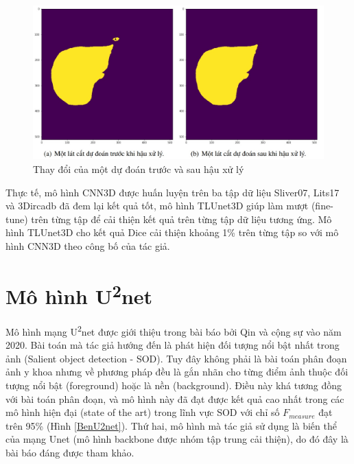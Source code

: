\begin{figure}[H]
    \centering
    \includegraphics[width=12cm]{images/liver/TLUnet3D/posprocessing.jpg}
    \caption{Thay đổi của một dự đoán trước và sau hậu xử lý \cite{LV_LIVER}}
    \label{posprocessing}
\end{figure}
\vspace{-5mm}
Thực tế, mô hình CNN3D được huấn luyện trên ba tập dữ liệu Sliver07, Lits17 và 3Dircadb đã đem lại kết quả tốt, mô hình TLUnet3D giúp làm mượt (fine-tune) trên từng tập để cải thiện kết quả trên từng tập dữ liệu tương ứng. Mô hình TLUnet3D cho kết quả Dice cải thiện khoảng 1\% trên từng tập so với mô hình CNN3D theo công bố của tác giả. 

\newpage

\section{Mô hình U\textsuperscript{2}net}
Mô hình mạng U\textsuperscript{2}net được giới thiệu trong bài báo \cite{u2-net} bởi Qin và cộng sự vào năm 2020. Bài toán mà tác giả hướng đến là phát hiện đối tượng nổi bật nhất trong ảnh (Salient object detection - SOD). Tuy đây không phải là bài toán phân đoạn ảnh y khoa nhưng về phương pháp đều là gắn nhãn cho từng điểm ảnh thuộc đối tượng nổi bật (foreground) hoặc là nền (background). Điều này khá tương đồng với bài toán phân đoạn, và mô hình này đã đạt được kết quả cao nhất trong các mô hình hiện đại (state of the art) trong lĩnh vực SOD với chỉ số $F_{measure}$ đạt trên 95\% (Hình \ref{BenU2net}). Thứ hai, mô hình mà tác giả sử dụng là biến thể của mạng Unet (mô hình backbone được nhóm tập trung cải thiện), do đó đây là bài báo đáng được tham khảo.

